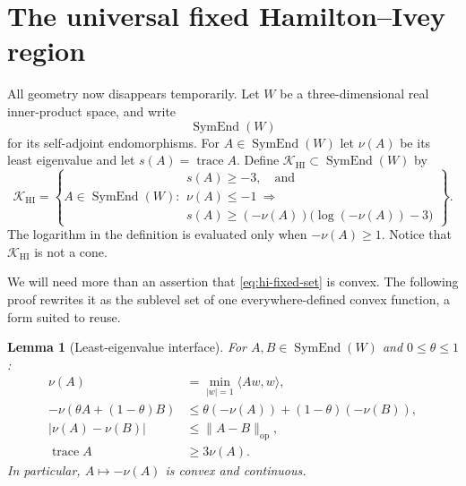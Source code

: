\documentclass[10pt]{coll-l}
\newcommand{\trace}{\operatorname{trace}}
\newtheorem{lemma}[theorem]{Lemma}
\theoremstyle{definition}
\theoremstyle{remark}
\numberwithin{section}{chapter}
\numberwithin{equation}{chapter}
\begin{document}
\section{The universal fixed Hamilton--Ivey region}
\label{sec:hi-fixed-region}

All geometry now disappears temporarily.  Let $W$ be a
three-dimensional real inner-product space, and write
\[
                   \operatorname{SymEnd}(W)
\]
for its self-adjoint endomorphisms.  For
$A\in\operatorname{SymEnd}(W)$ let $\nu(A)$ be its least eigenvalue and let
$s(A)=\trace A$.  Define
$\mathcal K_{\mathrm{HI}}\subset\operatorname{SymEnd}(W)$ by
\begin{equation}
 \mathcal K_{\mathrm{HI}}
   =
   \left\{
   A\in\operatorname{SymEnd}(W):
   \begin{array}{l}
      s(A)\geq-3,\quad\text{and}\\[1mm]
      \nu(A)\leq-1\ \Longrightarrow\\
      s(A)\geq
      (-\nu(A))\bigl(\log(-\nu(A))-3\bigr)
   \end{array}
   \right\}.                                              \label{eq:hi-fixed-set}
\end{equation}
The logarithm in the definition is evaluated only when
$-\nu(A)\geq1$.  Notice that $\mathcal K_{\mathrm{HI}}$ is not a cone.

We will need more than an assertion that
\eqref{eq:hi-fixed-set} is convex.  The following proof rewrites it as the
sublevel set of one everywhere-defined convex function, a form suited to
reuse.

\begin{lemma}[Least-eigenvalue interface]
\label{lem:hi-least-eigenvalue}
For $A,B\in\operatorname{SymEnd}(W)$ and $0\leq\theta\leq1$:
\begin{align}
 \nu(A)
   &=\min_{\lvert w\rvert=1}\langle Aw,w\rangle,           \label{eq:hi-rayleigh}\\
 -\nu(\theta A+(1-\theta)B)
   &\leq
     \theta(-\nu(A))+(1-\theta)(-\nu(B)),                  \label{eq:hi-minus-min-convex}\\
 |\nu(A)-\nu(B)|
   &\leq\|A-B\|_{\mathrm{op}},                             \label{eq:hi-min-lipschitz}\\
 \trace A&\geq3\nu(A).                                    \label{eq:hi-trace-min}
\end{align}
In particular, $A\mapsto-\nu(A)$ is convex and continuous.
\end{lemma}
\end{document}
